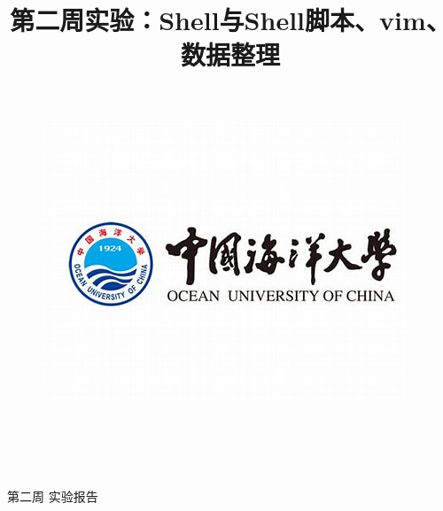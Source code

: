 \documentclass[UTF8]{ctexart}
\title{{\heiti  第二周实验：Shell与Shell脚本、vim、数据整理 }\vspace{-2em}}
\date{}
\begin{document}
\thispagestyle{empty}  %
\begin{figure}[tph!] %
	\centering
	\includegraphics[width=0.7\linewidth]{../git&latex learn/figure/2}
	
\end{figure}

\begin{center}%
	\quad \\ %
	\quad \\
	\quad \\
	\quad \\
	\heiti \fontsize{30}{17} \quad \quad 第\quad 二\quad 周\quad \quad \quad 
	\vskip 0.5cm
	\songti {} 实\quad 验\quad 报\quad 告%
\end{center}
\vskip 1cm
\end{document}
